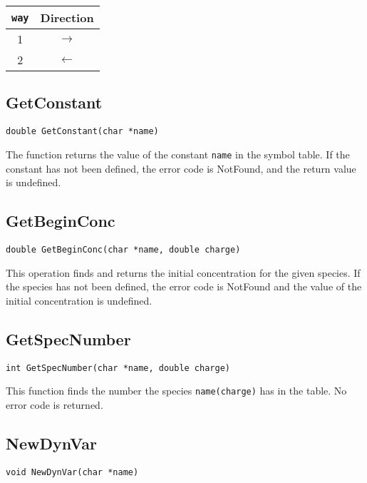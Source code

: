 \vspace{.2cm}
\begin{center}
\begin{tabular}{cc}
\hline
 {\tt way}   & Direction \\ \hline 
 1           & $\rightarrow$ \\ 
 2           & $\leftarrow$ \\ 
\hline
\end{tabular}
\end{center}
\vspace{.2cm}

\subsection{GetConstant}
\begin{verbatim}
double GetConstant(char *name)
\end{verbatim}

The function returns the value of the constant {\tt name} in the 
symbol table. If the constant has not been defined, the error code 
is NotFound, and the return value is undefined.

\subsection{GetBeginConc}
\begin{verbatim}
double GetBeginConc(char *name, double charge)
\end{verbatim}

This operation finds and returns the initial concentration for the 
given species. If the species has not been defined, the error code 
is NotFound and the value of the initial concentration is undefined.

\subsection{GetSpecNumber}  
\begin{verbatim}
int GetSpecNumber(char *name, double charge)
\end{verbatim}

This function finds the number the species {\tt name(charge)}
has in the table. No error code is returned.

\subsection{NewDynVar}
\begin{verbatim}
void NewDynVar(char *name)
\end{verbatim}

